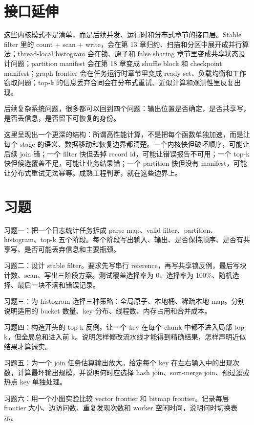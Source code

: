 \section{接口延伸}

这些内核模式不是清单，而是后续并发、运行时和分布式章节的接口层。Stable filter 里的 count + scan + write，会在第 13 章归约、扫描和分区中展开成并行算法；thread-local histogram 会在锁、原子和 false sharing 章节里变成共享状态设计问题；partition manifest 会在第 18 章变成 shuffle block 和 checkpoint manifest；graph frontier 会在任务运行时章节里变成 ready set、负载均衡和工作窃取问题；top-k 的信息丢弃合同会在分布式重试、近似计算和观测性里反复出现。

\begin{mentalmodel}
后续复杂系统问题，很多都可以回到四个问题：输出位置是否确定，是否共享写，是否丢信息，是否留下可恢复的身份。
\end{mentalmodel}

这里呈现出一个更深的结构：所谓高性能计算，不是把每个函数单独加速，而是让每个 stage 的语义、数据移动和恢复边界都清楚。一个内核快但破坏顺序，可能让后续 join 错；一个 filter 快但丢掉 record id，可能让错误报告不可用；一个 top-k 快但候选覆盖不足，可能让业务结果错；一个 partition 快但没有 manifest，可能让分布式重试无法幂等。成熟工程判断，就在这些边界上。

\section{习题}

\begin{exercisebox}
习题一：把一个日志统计任务拆成 parse map、valid filter、partition、histogram、top-k 五个阶段。每个阶段写出输入、输出、是否保持顺序、是否有共享写、是否可能丢弃信息和主要瓶颈。

习题二：设计 stable filter。要求先写串行  reference，再写共享锁反例，最后写块计数、scan、写出三阶段方案。测试覆盖选择率为 0、选择率为 100\%、随机选择、最后一块不满和错误记录。

习题三：为 histogram 选择三种策略：全局原子、本地桶、稀疏本地 map。分别说明适用的 bucket 数量、key 分布、线程数、内存占用和合并成本。

习题四：构造开头的 top-k 反例。让一个 key 在每个 chunk 中都不进入局部 top-k，但全局总和进入前 k。说明怎样修改流水线才能得到精确结果，怎样声明近似结果才算诚实。

习题五：为一个 join 任务估算输出放大。给定每个 key 在左右输入中的出现次数，计算最坏输出规模，并说明何时应选择 hash join、sort-merge join、预过滤或热点 key 单独处理。

习题六：用一个小图实验比较 vector frontier 和 bitmap frontier。记录每层 frontier 大小、边访问数、重复发现次数和 worker 空闲时间，说明何时切换表示。
\end{exercisebox}
